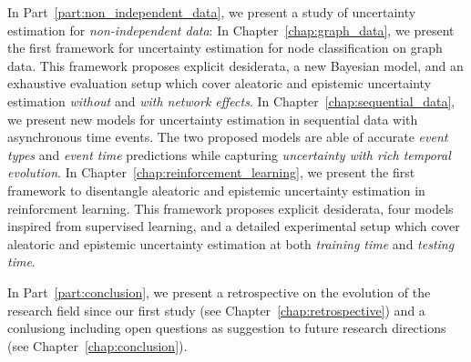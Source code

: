 In Part~\ref{part:non_independent_data}, we present a study of uncertainty estimation for \emph{non-independent data}:
In Chapter~\ref{chap:graph_data}, we present the first framework for uncertainty estimation for node classification on graph data. This framework proposes explicit desiderata, a new Bayesian model, and an exhaustive evaluation setup which cover aleatoric and epistemic uncertainty estimation \emph{without} and \emph{with network effects}.
In Chapter~\ref{chap:sequential_data}, we present new models for uncertainty estimation in sequential data with asynchronous time events. The two proposed models are able of accurate \emph{event types} and \emph{event time} predictions while capturing \emph{uncertainty with rich temporal evolution}.
In Chapter~\ref{chap:reinforcement_learning}, we present the first framework to disentangle aleatoric and epistemic uncertainty estimation in reinforcment learning. This framework proposes explicit desiderata, four models inspired from supervised learning, and a detailed experimental setup which cover aleatoric and epistemic uncertainty estimation at both \emph{training time} and \emph{testing time}.

In Part~\ref{part:conclusion}, we present a retrospective on the evolution of the research field since our first study (see Chapter~\ref{chap:retrospective}) and a conlusiong including open questions as suggestion to future research directions (see Chapter~\ref{chap:conclusion}).

